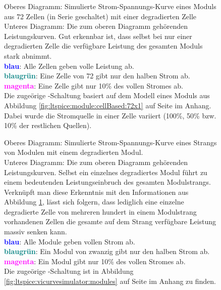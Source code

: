 \begin{figure}[h!tb]
    
    \caption{%
        Oberes Diagramm: Simulierte  Strom-Spannungs-Kurve eines Moduls  aus 72
        Zellen (in Serie geschaltet) mit einer degradierten Zelle\protect\\
        Unteres Diagramm: Die zum oberen Diagramm geh\"orenden Leistungskurven.
        Gut erkennbar  ist, dass  selbst bei nur  einer degradierten  Zelle die
        verf\"ugbare Leistung des gesamten Moduls stark abnimmt.\protect\\
        \textbf{\textcolor{blue}{blau}}: Alle   Zellen  geben   volle  Leistung
        ab.\protect\\
        \textbf{\textcolor{teal}{blaugr\"un}}: Eine Zelle  von 72 gibt  nur den
        halben Strom ab.\protect\\
        \textbf{\textcolor{magenta}{magenta}}: Eine  Zelle  gibt nur  10\%  des
        vollen Stromes ab.\protect\\
        Die zuge\"orige -Schaltung basiert  auf dem Modell eines
        Moduls aus Abbildung \ref{fig:ltspice:module:cellBased:72x1} auf Seite
        \pageref{fig:ltspice:module:cellBased:72x1} im Anhang. Dabei wurde die
        Stromquelle  in  einer  Zelle  variiert  (100\%,  50\%  bzw. 10\%  der
        restlichen Quellen).%
    }
    \label{fig:ivcurve:cells}
\end{figure}
\begin{figure}[h!tb]
    
    \caption{%
        Oberes   Diagramm: Simulierte   Strom-Spannungs-Kurve  eines   Strangs
        von   Modulen   mit   einem  degradierten   Modul.\protect\\   Unteres
        Diagramm: Die  zum   oberen  Diagramm   geh\"orenden  Leistungskurven.
        Selbst   ein   einzelnes   degradiertes   Modul   f\"uhrt   zu   einem
        bedeutenden Leistungseinbruch des  gesamten Modulstrangs.  Verkn\"upft
        man   diese   Erkenntnis   mit   den   Informationen   aus   Abbildung
        \ref{fig:ivcurve:cells},  l\"asst sich  folgern,  dass lediglich  eine
        einzelne degradierte  Zelle von mehreren hundert  in einem Modulstrang
        vorhandenen Zellen  die gesamte  auf dem Strang  verf\"ugbare Leistung
        massiv senken kann.\protect\\
        \textbf{\textcolor{blue}{blau}}: Alle   Module   geben  vollen   Strom
        ab.\protect\\
        \textbf{\textcolor{teal}{blaugr\"un}}: Ein Modul von  zwanzig gibt nur
        den halben Strom ab.\protect\\
        \textbf{\textcolor{magenta}{magenta}}: Ein  Modul  gibt nur  10\%  des
        vollen Stromes ab.\protect\\
        Die       zuge\"orige       -Schaltung      ist       in
        Abbildung    \ref{fig:ltspice:vicurvesimulator:modules}   auf    Seite
        \pageref{fig:ltspice:vicurvesimulator:modules} im Anhang zu finden.%
    }
    \label{fig:ivcurve:modules}
\end{figure}


